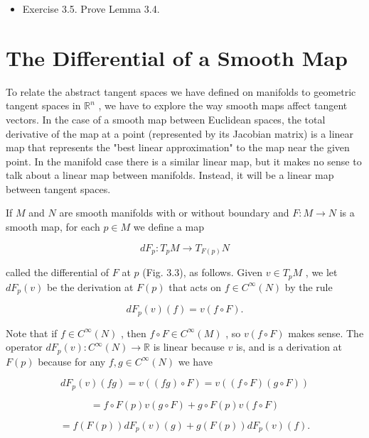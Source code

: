 \begin{exercise}
\label{exer:3-5}
\leanok
{}
\begin{itemize}
\item Exercise 3.5. Prove Lemma 3.4.
\end{itemize}
\end{exercise}


\section{The Differential of a Smooth Map}

\begin{definition}
\label{def:3-14-extra-1}
\mathlibok
To relate the abstract tangent spaces we have defined on manifolds to geometric tangent spaces in ${\mathbb{R}}^{n}$ , we have to explore the way smooth maps affect tangent vectors. In the case of a smooth map between Euclidean spaces, the total derivative of the map at a point (represented by its Jacobian matrix) is a linear map that represents the "best linear approximation" to the map near the given point. In the manifold case there is a similar linear map, but it makes no sense to talk about a linear map between manifolds. Instead, it will be a linear map between tangent spaces.

If $M$ and $N$ are smooth manifolds with or without boundary and $F : M \rightarrow  N$ is a smooth map, for each $p \in  M$ we define a map

\[
d{F}_{p} : {T}_{p}M \rightarrow  {T}_{F\left( p\right) }N
\]

called the differential of $F$ at $p$ (Fig. 3.3), as follows. Given $v \in  {T}_{p}M$ , we let $d{F}_{p}\left( v\right)$ be the derivation at $F\left( p\right)$ that acts on $f \in  {C}^{\infty }\left( N\right)$ by the rule

\[
d{F}_{p}\left( v\right) \left( f\right)  = v\left( {f \circ  F}\right) .
\]

Note that if $f \in  {C}^{\infty }\left( N\right)$ , then $f \circ  F \in  {C}^{\infty }\left( M\right)$ , so $v\left( {f \circ  F}\right)$ makes sense. The operator $d{F}_{p}\left( v\right)  : {C}^{\infty }\left( N\right)  \rightarrow  \mathbb{R}$ is linear because $v$ is, and is a derivation at $F\left( p\right)$ because for any $f, g \in  {C}^{\infty }\left( N\right)$ we have

\[
d{F}_{p}\left( v\right) \left( {fg}\right)  = v\left( {\left( {fg}\right)  \circ  F}\right)  = v\left( {\left( {f \circ  F}\right) \left( {g \circ  F}\right) }\right)
\]

\[
= f \circ  F\left( p\right) v\left( {g \circ  F}\right)  + g \circ  F\left( p\right) v\left( {f \circ  F}\right)
\]

\[
= f\left( {F\left( p\right) }\right) d{F}_{p}\left( v\right) \left( g\right)  + g\left( {F\left( p\right) }\right) d{F}_{p}\left( v\right) \left( f\right) .
\]
\end{definition}

